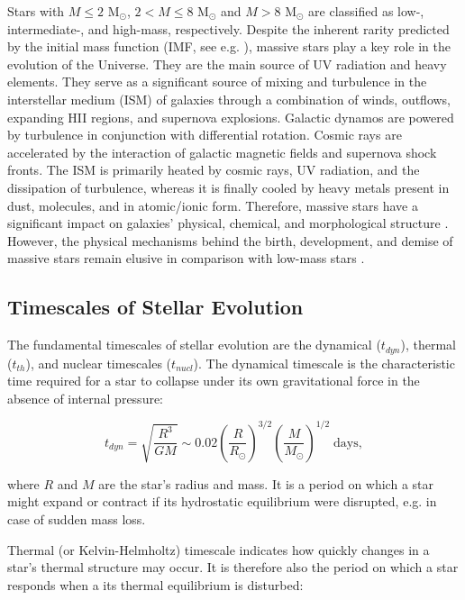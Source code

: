 Stars with $M \leq 2$ M$_{\odot}$, $2 < M \leq 8$ M$_{\odot}$ and $M > 8$ M$_{\odot}$ are classified as low-, intermediate-, and high-mass, respectively. Despite the inherent rarity predicted by the initial mass function (IMF, see e.g. \cite{chabrier2005initial, dib2018emergence}), massive stars play a key role in the evolution of the Universe. They are the main source of UV radiation and heavy elements. They serve as a significant source of mixing and turbulence in the interstellar medium (ISM) of galaxies through a combination of winds, outflows, expanding HII regions, and supernova explosions. Galactic dynamos are powered by turbulence in conjunction with differential rotation. Cosmic rays are accelerated by the interaction of galactic magnetic fields and supernova shock fronts. The ISM is primarily heated by cosmic rays, UV radiation, and the dissipation of turbulence, whereas it is finally cooled by heavy metals present in dust, molecules, and in atomic/ionic form. Therefore, massive stars have a significant impact on galaxies' physical, chemical, and morphological structure \citep{kennicutt2005role}. However, the physical mechanisms behind the birth, development, and demise of massive stars remain elusive in comparison with low-mass stars \citep{zinnecker2007toward}. 


\subsection{Timescales of Stellar Evolution}

The fundamental timescales of stellar evolution are the dynamical ($t_{dyn}$), thermal ($t_{th}$), and nuclear timescales ($t_{nucl}$). The dynamical timescale is the characteristic time required for a star to collapse under its own gravitational force in the absence of internal pressure:

\begin{equation}
    t_{dyn} = \sqrt{\frac{R^3}{GM}} \sim 0.02 \left( \frac{R}{R_{\odot}} \right)^{3/2} \left( \frac{M}{M_{\odot}}\right)^{1/2} \; \text{days},
\end{equation}\label{eq:dynamical_timsecale}

where $R$ and $M$ are the star's radius and mass. It is a period on which a star might expand or contract if its hydrostatic equilibrium were disrupted, e.g. in case of sudden mass loss.

Thermal (or Kelvin-Helmholtz) timescale indicates how quickly changes in a star's thermal structure may occur. It is therefore also the period on which a star responds when a its thermal equilibrium is disturbed:

